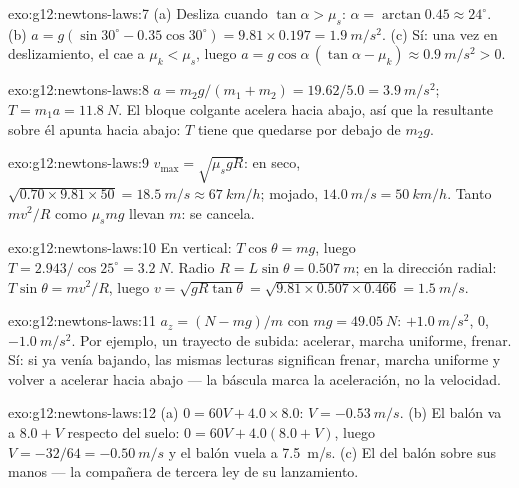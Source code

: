 \begin{solution}{exo:g12:newtons-laws:7}
(a) Desliza cuando $\tan\alpha > \mu_s$:
$\alpha = \arctan 0.45 \approx 24^\circ$.
(b) $a = g(\sin 30^\circ - 0.35\cos 30^\circ) = 9.81 \times 0.197 =
\qty{1.9}{m/s^2}$. (c) Sí: una vez en deslizamiento, el  cae a
$\mu_k < \mu_s$, luego
$a = g\cos\alpha\,(\tan\alpha - \mu_k) \approx \qty{0.9}{m/s^2} > 0$.
\end{solution}

\begin{solution}{exo:g12:newtons-laws:8}
$a = m_2 g/(m_1 + m_2) = 19.62/5.0 = \qty{3.9}{m/s^2}$;
$T = m_1 a = \qty{11.8}{N}$. El bloque colgante acelera hacia abajo, así
que la  resultante sobre él apunta hacia abajo: $T$ tiene que
quedarse por debajo de $m_2 g$.
\end{solution}

\begin{solution}{exo:g12:newtons-laws:9}
$v_{\max} = \sqrt{\mu_s g R}$: en seco,
$\sqrt{0.70 \times 9.81 \times 50} = \qty{18.5}{m/s} \approx
\qty{67}{km/h}$; mojado, $\qty{14.0}{m/s} = \qty{50}{km/h}$. Tanto
$mv^2/R$ como $\mu_s mg$ llevan $m$: se cancela.
\end{solution}

\begin{solution}{exo:g12:newtons-laws:10}
En vertical: $T\cos\theta = mg$, luego
$T = 2.943/\cos 25^\circ = \qty{3.2}{N}$. Radio
$R = L\sin\theta = \qty{0.507}{m}$; en la dirección radial:
$T\sin\theta = mv^2/R$, luego
$v = \sqrt{gR\tan\theta} = \sqrt{9.81 \times 0.507 \times 0.466}
= \qty{1.5}{m/s}$.
\end{solution}

\begin{solution}{exo:g12:newtons-laws:11}
$a_z = (N - mg)/m$ con $mg = \qty{49.05}{N}$: $+\qty{1.0}{m/s^2}$, $0$,
$-\qty{1.0}{m/s^2}$. Por ejemplo, un trayecto de subida: acelerar,
marcha uniforme, frenar. Sí: si ya venía bajando, las mismas lecturas
significan frenar, marcha uniforme y volver a acelerar hacia abajo --- la
báscula marca la aceleración, no la velocidad.
\end{solution}

\begin{solution}{exo:g12:newtons-laws:12}
(a) $0 = 60V + 4.0 \times 8.0$: $V = \qty{-0.53}{m/s}$.
(b) El balón va a $8.0 + V$ respecto del suelo:
$0 = 60V + 4.0(8.0 + V)$, luego $V = -32/64 = \qty{-0.50}{m/s}$ y el
balón vuela a \qty{7.5}{m/s}. (c) El  del balón sobre sus manos ---
la compañera de tercera ley de su lanzamiento.
\end{solution}

